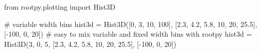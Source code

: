 \begin{footnotesize}
\begin{pyglist}[language=python,texcl=true,style=vs,bgcolor=Moccasin]
from rootpy.plotting import Hist3D

# variable width bins
hist3d = Hist3D([0, 3, 10, 100], [2.3, 4.2, 5.8, 10, 20, 25.5], [-100, 0, 20])
# easy to mix variable and fixed width bins with rootpy
hist3d = Hist3D(3, 0, 5, [2.3, 4.2, 5.8, 10, 20, 25.5], [-100, 0, 20])
\end{pyglist}
\end{footnotesize}
